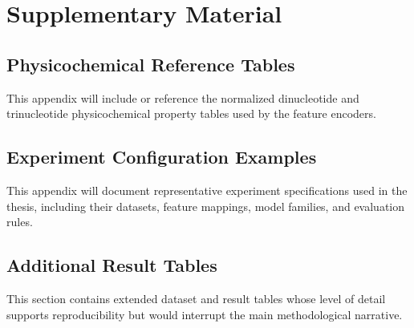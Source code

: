 \chapter{Supplementary Material}\label{app:supplementary-material}

\section{Physicochemical Reference Tables}\label{app:physicochemical-tables}

This appendix will include or reference the normalized dinucleotide and
trinucleotide physicochemical property tables used by the feature encoders.

\section{Experiment Configuration Examples}\label{app:configuration-examples}

This appendix will document representative experiment specifications used in the thesis, including their datasets, feature mappings, model families, and evaluation rules.

\section{Additional Result Tables}\label{app:additional-results}

This section contains extended dataset and result tables whose level of detail
supports reproducibility but would interrupt the main methodological narrative.




